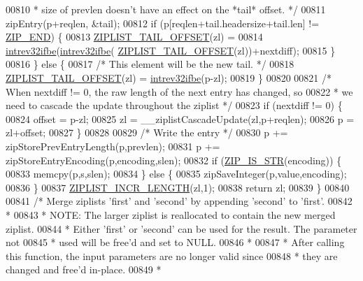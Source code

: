 \begin{DoxyCode}
{{00810 \textcolor{comment}{         * size of prevlen doesn't have an effect on the *tail* offset. */}
00811         zipEntry(p+reqlen, &tail);
00812         \textcolor{keywordflow}{if} (p[reqlen+tail.headersize+tail.len] != \hyperlink{ziplist_8c_a31a8f9d5b5bad75318741cfca5de5ea8}{ZIP\_END}) \{
00813             \hyperlink{ziplist_8c_adf2235d74c81861c85fb5d2ffa209397}{ZIPLIST\_TAIL\_OFFSET}(zl) =
00814                 \hyperlink{endianconv_8h_a4e85d9ae58a3b1e6ceaabfd4689002c7}{intrev32ifbe}(\hyperlink{endianconv_8h_a4e85d9ae58a3b1e6ceaabfd4689002c7}{intrev32ifbe}(
      \hyperlink{ziplist_8c_adf2235d74c81861c85fb5d2ffa209397}{ZIPLIST\_TAIL\_OFFSET}(zl))+nextdiff);
00815         \}
00816     \} \textcolor{keywordflow}{else} \{
00817         \textcolor{comment}{/* This element will be the new tail. */}
00818         \hyperlink{ziplist_8c_adf2235d74c81861c85fb5d2ffa209397}{ZIPLIST\_TAIL\_OFFSET}(zl) = \hyperlink{endianconv_8h_a4e85d9ae58a3b1e6ceaabfd4689002c7}{intrev32ifbe}(p-zl);
00819     \}
00820 
00821     \textcolor{comment}{/* When nextdiff != 0, the raw length of the next entry has changed, so}
00822 \textcolor{comment}{     * we need to cascade the update throughout the ziplist */}
00823     \textcolor{keywordflow}{if} (nextdiff != 0) \{
00824         offset = p-zl;
00825         zl = \_\_ziplistCascadeUpdate(zl,p+reqlen);
00826         p = zl+offset;
00827     \}
00828 
00829     \textcolor{comment}{/* Write the entry */}
00830     p += zipStorePrevEntryLength(p,prevlen);
00831     p += zipStoreEntryEncoding(p,encoding,slen);
00832     \textcolor{keywordflow}{if} (\hyperlink{ziplist_8c_a2cb79e478d5bda74592c92230cfd6761}{ZIP\_IS\_STR}(encoding)) \{
00833         memcpy(p,s,slen);
00834     \} \textcolor{keywordflow}{else} \{
00835         zipSaveInteger(p,value,encoding);
00836     \}
00837     \hyperlink{ziplist_8c_a929244a46d13b9b5e1007136d3922daf}{ZIPLIST\_INCR\_LENGTH}(zl,1);
00838     \textcolor{keywordflow}{return} zl;
00839 \}
00840 
00841 \textcolor{comment}{/* Merge ziplists 'first' and 'second' by appending 'second' to 'first'.}
00842 \textcolor{comment}{ *}
00843 \textcolor{comment}{ * NOTE: The larger ziplist is reallocated to contain the new merged ziplist.}
00844 \textcolor{comment}{ * Either 'first' or 'second' can be used for the result.  The parameter not}
00845 \textcolor{comment}{ * used will be free'd and set to NULL.}
00846 \textcolor{comment}{ *}
00847 \textcolor{comment}{ * After calling this function, the input parameters are no longer valid since}
00848 \textcolor{comment}{ * they are changed and free'd in-place.}
00849 \textcolor{comment}{ *}
}}
\end{DoxyCode}
